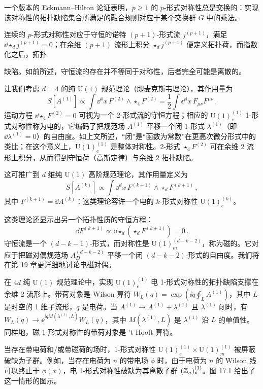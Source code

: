 \begin{remark}[17.12] 一个版本的 Eckmann–Hilton 论证表明，$p\ge 1$ 的 $p$-形式对称性总是交换的：实现该对称性的拓扑缺陷集合所满足的融合规则对应于某个交换群 $G$ 中的乘法。\end{remark}

连续的 $p$-形式对称性对应于守恒的诺特 $(p+1)$-形式流 $j^{(p+1)}$，满足 $\dd\star_d j^{(p+1)}=0$；在余维 $(p+1)$ 流形上积分 $\star_d j^{(p+1)}$ 便定义拓扑荷，而指数化之后，拓扑

缺陷。如前所述，守恒流的存在并不等同于对称性，后者完全可能是离散的。

让我们考虑 $d=4$ 的纯 $\mathrm{U}(1)$ 规范理论（即麦克斯韦理论），其作用量为
\[
S[A^{(1)}]\propto\int \dd^4x\,F^{(2)}\wedge\star_4 F^{(2)}=\frac{1}{2}\int \dd^4x\,F_{\mu\nu}F^{\mu\nu}\,.
\]
运动方程 $\dd\star_4 F^{(2)}=0$ 可视为一个 2-形式流的守恒方程；相应的 $\mathrm{U}(1)_e^{(1)}$ 1-形式对称性称为电的，它编码了把规范场 $A^{(1)}$ 平移一个闭 1-形式 $\lambda^{(1)}$（即 $\dd\lambda^{(1)}=0$）的自由度。如上文所述，“闭”是“函数为常数”在更高次微分形式中的类比；在这个意义上，$\mathrm{U}(1)_e^{(1)}$ 是整体对称性。2-形式 $\star_4 F^{(2)}$ 可在余维 2 流形上积分，从而得到守恒荷（高斯定律）与余维 2 拓扑缺陷。

这可推广到 $d$ 维纯 $\mathrm{U}(1)$ 高阶规范理论，其作用量定义为
\[
S[A^{(k)}]\propto\int \dd^dx\,F^{(k+1)}\wedge\star_d F^{(k+1)}\,,
\]
其中 $F^{(k+1)}=\dd A^{(k)}$：这类理论容许一个电的 $k$-形式对称性 $\mathrm{U}(1)_e^{(k)}$。

这类理论还显示出另一个拓扑性质的守恒方程：
\[
\dd F^{(k+1)}\propto\dd\star_d\left(\star_d F^{(k+1)}\right)=0\,.
\]
守恒流是一个 $(d-k-1)$-形式，而对称性是 $\mathrm{U}(1)_m^{(d-k-2)}$，称为磁的。它对应于把磁对偶规范场 $A_D^{(d-k-2)}$ 平移一个闭 $(d-k-2)$-形式的自由度。我们将在第 19 章更详细地讨论电磁对偶。

在 $4d$ 纯 $\mathrm{U}(1)$ 规范理论中，实现 $\mathrm{U}(1)_e^{(1)}$ 电 1-形式对称性的拓扑缺陷支撑在余维 2 流形上。带荷对象是 Wilson 算符 $W_L(q)=\exp(\ii q\oint_L A^{(1)})$，其中 $L$ 是时空的 1 维子流形，$q$ 是电荷。当 $A^{(1)}\to A^{(1)}+\lambda^{(1)}$ 且 $\lambda^{(1)}$ 闭时，有 $W_L(q)\to\ee^{\ii qM(\lambda^{(1)},L)}W_L(q)$，其中 $M(\lambda^{(1)},L)$ 是 $\lambda^{(1)}$ 沿 $L$ 的单值性。同样地，磁 1-形式对称性的带荷对象是 't Hooft 算符。

当存在带电荷和/或带磁荷的场时，1-形式对称性 $\mathrm{U}(1)_e^{(1)}\times\mathrm{U}(1)_m^{(1)}$ 被屏蔽破缺为子群。例如，当存在电荷为 $n$ 的带电场 $\phi$ 时，由于电荷为 $n$ 的 Wilson 线可以终止于 $\phi(x)$，电 1-形式对称性破缺为其离散子群 $(\mathbb{Z}_n)_e^{(1)}$。图 17.1 给出了这一情形的图示。

